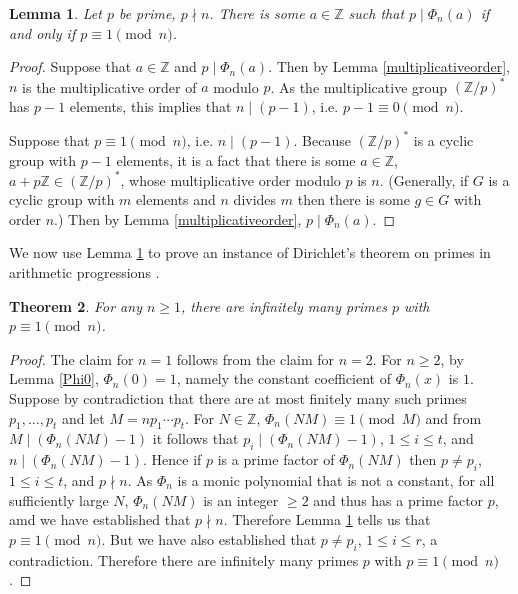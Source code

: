 \documentclass{article}
\newtheorem{theorem}{Theorem}
\newtheorem{lemma}[theorem]{Lemma}
\theoremstyle{definition}
\begin{document}
\begin{lemma}
Let $p$ be prime, $p \nmid n$. There is some $a \in \mathbb{Z}$ such that $p \mid \Phi_n(a)$ if and only if
$p \equiv 1 \pmod{n}$. 
\label{aPhi}
\end{lemma}
\begin{proof}
Suppose that $a \in \mathbb{Z}$ and $p \mid \Phi_n(a)$. Then by Lemma \ref{multiplicativeorder},
$n$ is the multiplicative order of $a$ modulo $p$. As the multiplicative group
$(\mathbb{Z}/p)^*$ has $p-1$ elements, this implies that $n \mid (p-1)$, i.e. $p-1 \equiv 0 \pmod{n}$.

Suppose that $p \equiv 1 \pmod{n}$, i.e. $n \mid (p-1)$. 
Because $(\mathbb{Z}/p)^*$ is a cyclic group with $p-1$ elements, it is a fact that 
there is some $a \in \mathbb{Z}$, $a+p\mathbb{Z} \in (\mathbb{Z}/p)^*$, whose multiplicative order modulo
$p$ is $n$. (Generally, if $G$ is a cyclic group with $m$ elements and $n$ divides $m$ then there is some
$g \in G$ with order $n$.) Then by Lemma \ref{multiplicativeorder}, $p \mid \Phi_n(a)$.
\end{proof}


We now use Lemma \ref{aPhi} to prove an instance of Dirichlet's theorem on primes in arithmetic progressions \cite[p.~13, Lemma 2.9]{washington}.


\begin{theorem}
For any $n \geq 1$, there are infinitely many primes $p$ with $p \equiv 1 \pmod{n}$.
\end{theorem}
\begin{proof}
The claim for $n=1$ follows from the claim for $n=2$. 
For $n \geq 2$, by Lemma \ref{Phi0}, $\Phi_n(0)=1$, namely the constant coefficient of $\Phi_n(x)$ is $1$. 
Suppose by contradiction that there are at most finitely many such primes $p_1,\ldots,p_t$
and let $M = np_1\cdots p_t$. For $N \in \mathbb{Z}$, $\Phi_n(NM) \equiv 1 \pmod{M}$ and
from $M \mid (\Phi_n(NM) - 1)$ it follows that $p_i \mid (\Phi_n(NM)-1)$, $1 \leq i \leq t$, and
$n \mid (\Phi_n(NM)-1)$. Hence if $p$ is a prime factor
of $\Phi_n(NM)$ then $p \neq p_i$, $1 \leq i \leq t$, and $p \nmid n$.
As $\Phi_n$ is a  monic polynomial that is not a constant,
for all sufficiently large $N$, $\Phi_n(NM)$ is an integer $\geq 2$ and thus has a prime factor $p$, amd we have
 established that $p \nmid n$. Therefore
Lemma \ref{aPhi} tells us that $p \equiv 1 \pmod{n}$. 
But we have also established that $p \neq p_i$, $1 \leq i \leq r$, a contradiction. Therefore
there are infinitely many primes $p$ with $p \equiv 1 \pmod{n}$.
\end{proof}
\end{document}
